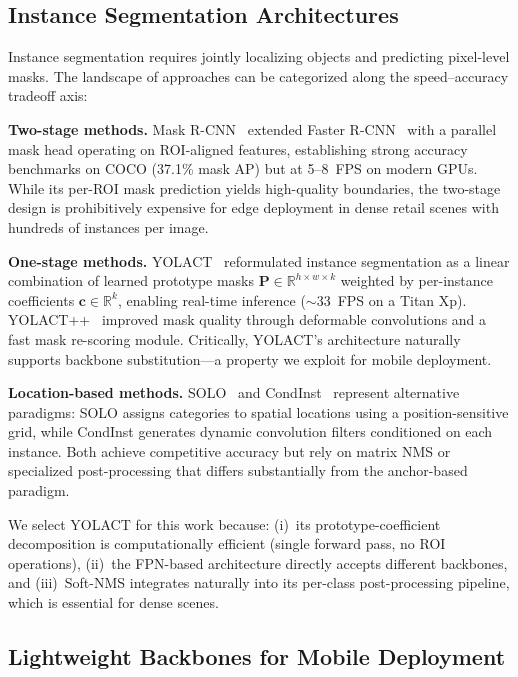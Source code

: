 \documentclass[conference]{IEEEtran}
\begin{document}
\subsection{Instance Segmentation Architectures}

Instance segmentation requires jointly localizing objects and predicting
pixel-level masks. The landscape of approaches can be categorized along
the speed--accuracy tradeoff axis:

\textbf{Two-stage methods.} Mask R-CNN~\cite{he2017mask} extended Faster
R-CNN~\cite{ren2015faster} with a parallel mask head operating on
ROI-aligned features, establishing strong accuracy benchmarks on COCO
(37.1\% mask AP) but at 5--8~FPS on modern GPUs. While its per-ROI
mask prediction yields high-quality boundaries, the two-stage design is
prohibitively expensive for edge deployment in dense retail scenes with
hundreds of instances per image.

\textbf{One-stage methods.} YOLACT~\cite{bolya2019yolact} reformulated
instance segmentation as a linear combination of learned prototype masks
$\mathbf{P} \in \mathbb{R}^{h \times w \times k}$ weighted by
per-instance coefficients $\mathbf{c} \in \mathbb{R}^k$, enabling
real-time inference ($\sim$33~FPS on a Titan Xp). YOLACT++~\cite{bolya2020yolact}
improved mask quality through deformable convolutions and a fast mask
re-scoring module. Critically, YOLACT's architecture naturally supports
backbone substitution---a property we exploit for mobile deployment.

\textbf{Location-based methods.} SOLO~\cite{wang2020solo} and
CondInst~\cite{tian2020conditional} represent alternative paradigms:
SOLO assigns categories to spatial locations using a position-sensitive
grid, while CondInst generates dynamic convolution filters conditioned on
each instance. Both achieve competitive accuracy but rely on matrix NMS
or specialized post-processing that differs substantially from the
anchor-based paradigm.

We select YOLACT for this work because: (i)~its prototype-coefficient
decomposition is computationally efficient (single forward pass, no ROI
operations), (ii)~the FPN-based architecture directly accepts different
backbones, and (iii)~Soft-NMS integrates naturally into its per-class
post-processing pipeline, which is essential for dense scenes.

\subsection{Lightweight Backbones for Mobile Deployment}
\end{document}
